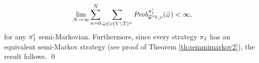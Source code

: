 \begin{myproof}
  \[
  \lim_{N \to \infty} \sum^{N}_{n=0} \sum_{\hat{\omega} \in v(V \setminus T)^n} \mathit{Prob}^{\pi_{1}'}_{\mathcal{G}^{\pi_{2}}, v}(\hat{\omega}) < \infty,
  \]
  for any $\pi_{1}'$ semi-Markovian.  Furthermore, since every
  strategy $\pi_{1}$ has an equivalent semi-Markov strategy (see
  proof of Theorem \ref{th:semmimarkov2}), the result follows.
  \qed
\end{myproof}



